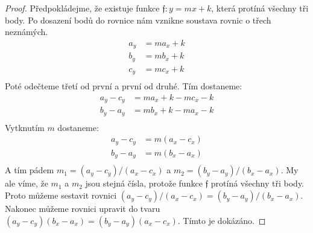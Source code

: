 \begin{proof}
    Předpokládejme, že existuje funkce $\mathfrak{f}: y = mx+k$, která protíná všechny tři body. Po dosazení bodů do rovnice nám vznikne soustava rovnic o třech neznámých. 
    \begin{align*}
        a_y &= ma_x+k \\
        b_y &= mb_x+k \\
        c_y &= mc_x+k \\
    \end{align*}
    Poté odečteme třetí od první a první od druhé. Tím dostaneme:
    \begin{align*}
        a_y-c_y &= ma_x+k - mc_x -k \\
        b_y-a_y &= mb_x+k -ma_x -k \\
    \end{align*}
    Vytknutím $m$ dostaneme:
    \begin{align*}
        a_y-c_y &= m(a_x-c_x) \\
        b_y-a_y &= m(b_x-a_x) \\
    \end{align*}
    A tím pádem $m_1 = (a_y-c_y)/(a_x-c_x)$ a $ m_2=(b_y-a_y)/(b_x-a_x)$. My ale víme, že $m_1$ a $m_2$ jsou stejná čísla, protože funkce $\mathfrak{f}$ protíná všechny tři body. Proto můžeme sestavit rovnici $(a_y-c_y)/(a_x-c_x) = (b_y-a_y)/(b_x-a_x)$. Nakonec můžeme rovnici upravit do tvaru $(a_y-c_y)(b_x-a_x) = (b_y-a_y)(a_x-c_x)$. Tímto je  dokázáno.
    
\end{proof}